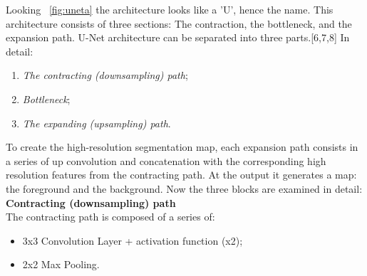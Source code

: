 \documentclass[12pt,a4paper,oneside]{report} %
\begin{document}
Looking \figurename~\ref{fig:uneta} the architecture looks like a 'U', hence the name. This architecture consists of three sections: The 
contraction, the bottleneck, and the expansion path. U-Net architecture can be separated into three parts.[6,7,8] In detail:
\begin{enumerate}
\item \textit{The contracting (downsampling) path};
\item \textit{Bottleneck};
\item \textit{The expanding (upsampling) path}.
\end{enumerate}

To create the high-resolution segmentation map, each expansion path consists in a series of up convolution and concatenation with the corresponding high resolution features from the 
contracting path. At the output it generates a map: the foreground and the background. Now the three blocks are examined in detail:
\\
\newline
{\large{\bf Contracting (downsampling) path}}\\
The contracting path is composed of a series of:
\begin{itemize}
\item 3x3 Convolution Layer + activation function (x2);
\item 2x2 Max Pooling.
\end{itemize}
\end{document}
